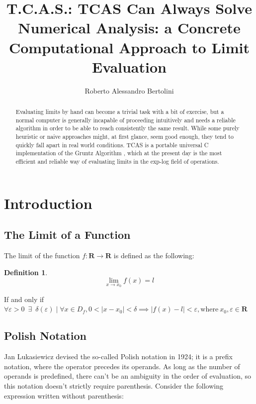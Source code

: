 \documentclass{article}
\title{\textbf{T.C.A.S.}: \textbf{T}CAS \textbf{C}an \textbf{A}lways \textbf{S}olve \\
	\large Numerical Analysis: a Concrete Computational Approach to Limit Evaluation}
\author{Roberto Alessandro Bertolini}
\date{}
\affil{Liceo Nervi Ferrari - Morbegno}
\theoremstyle{plain}
\theoremstyle{definition}
\newtheorem{defn}[thm]{Definition}
\begin{document}
	\maketitle
	
	\begin{abstract}
		Evaluating limits by hand can become a trivial task with a bit of exercise, but a normal computer is generally incapable of proceeding intuitively and needs a reliable algorithm in order to be able to reach consistently the same result. 
		While some purely heuristic or naive approaches might, at first glance, seem good enough, they tend to quickly fall apart in real world conditions. TCAS is a portable universal C implementation of the Gruntz Algorithm \cite{gruntz}, which at the present day is the most efficient and reliable way of evaluating limits in the exp-log field of operations.
	\end{abstract}
	
	\tableofcontents
	
	\newpage	
	
	\section{Introduction}
	
	\subsection{The Limit of a Function}
	
	The limit of the function $ f: \mathbf{R} \rightarrow \mathbf{R} $ is defined as the following:
	
	\begin{defn}
		\[ 
		\lim_{x \to x_{0}}{f(x) = l} 
		\]
		
		If and only if \( 
		\forall \varepsilon > 0 \enspace \exists \enspace \delta(\varepsilon) \mid \forall x \in D_{f}, 0 < \mid x - x_{0} \mid < \delta \implies \mid f(x) - l \mid < \varepsilon, \text{where} \: x_{0}, \varepsilon \in \mathbf{R}
		\)
	\end{defn}
	
	\subsection{Polish Notation}
	
	Jan Lukasiewicz devised the so-called Polish notation \cite{wiki:polish} in 1924; it is a prefix notation, where the operator precedes its operands.
	As long as the number of operands is predefined, there can't be an ambiguity in the order of evaluation, so this notation doesn't strictly require parenthesis.
	Consider the following expression written without parenthesis:
	
\end{document}
